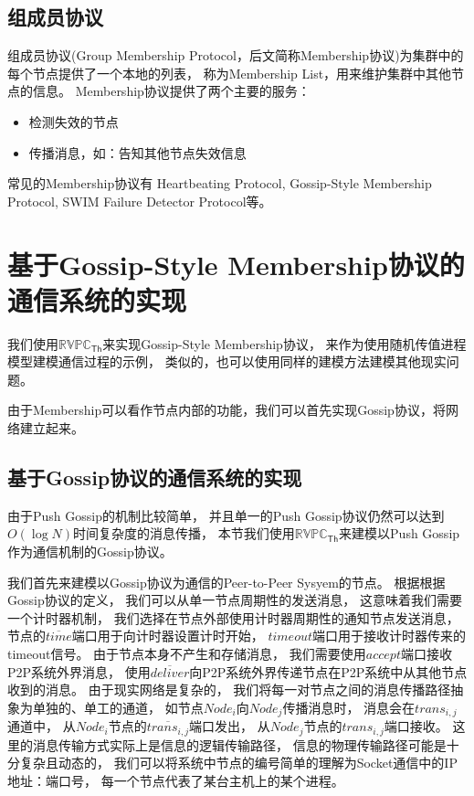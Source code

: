 \subsection{组成员协议}

组成员协议(Group Membership Protocol，后文简称Membership协议)\cite{Membership}为集群中的每个节点提供了一个本地的列表，
称为Membership List，用来维护集群中其他节点的信息。
Membership协议提供了两个主要的服务：
\begin{itemize}
   \item 检测失效的节点
   \item 传播消息，如：告知其他节点失效信息
\end{itemize}

常见的Membership协议有
Heartbeating Protocol\cite{Heartbeat}, 
Gossip-Style Membership Protocol\cite{Gossip_style}, 
SWIM Failure Detector Protocol\cite{SWIM}等。

\section{基于Gossip-Style Membership协议的通信系统的实现}
我们使用$\mathbb{RVPC}_{\mathsf{Th}}$来实现Gossip-Style Membership协议\cite{Gossip_style}，
来作为使用随机传值进程模型建模通信过程的示例，
类似的，也可以使用同样的建模方法建模其他现实问题。

由于Membership可以看作节点内部的功能，我们可以首先实现Gossip协议，将网络建立起来。

\subsection{基于Gossip协议的通信系统的实现}\label{ch:gossip_impl}
由于Push Gossip的机制比较简单，
并且单一的Push Gossip协议仍然可以达到$O(\log N)$时间复杂度的消息传播\cite{Gossip}，
本节我们使用$\mathbb{RVPC}_{\mathsf{Th}}$来建模以Push Gossip作为通信机制的Gossip协议。

我们首先来建模以Gossip协议为通信的Peer-to-Peer Sysyem的节点。
根据根据Gossip协议的定义，
我们可以从单一节点周期性的发送消息，
这意味着我们需要一个计时器机制，
我们选择在节点外部使用计时器周期性的通知节点发送消息，
节点的$\overline{time}$端口用于向计时器设置计时开始，
$timeout$端口用于接收计时器传来的timeout信号。
由于节点本身不产生和存储消息，
我们需要使用$accept$端口接收P2P系统外界消息，
使用$\overline{deliver}$向P2P系统外界传递节点在P2P系统中从其他节点收到的消息。
由于现实网络是复杂的，
我们将每一对节点之间的消息传播路径抽象为单独的、单工的通道，
如节点$Node_i$向$Node_j$传播消息时，
消息会在$trans_{i,j}$通道中，
从$Node_i$节点的$\overline{trans_{i,j}}$端口发出，
从$Node_j$节点的$trans_{i,j}$端口接收。
这里的消息传输方式实际上是信息的逻辑传输路径，
信息的物理传输路径可能是十分复杂且动态的，
我们可以将系统中节点的编号简单的理解为Socket通信中的IP地址：端口号，
每一个节点代表了某台主机上的某个进程。

